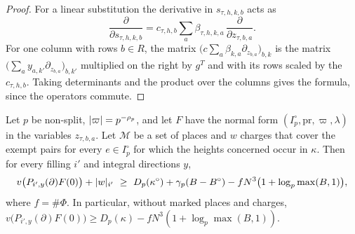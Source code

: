 \begin{proof}
For a linear substitution the derivative in $s_{\tau,h,k,b}$ acts as
\[
  \frac{\partial}{\partial s_{\tau,h,k,b}}=c_{\tau,h,b}\sum_a\beta_{\tau,h,k,a}\,
  \frac{\partial}{\partial z_{\tau,b,a}} .
\]
For one column with rows
$b\in R$, the matrix $\bigl(c\sum_a\beta_{k,a}\partial_{z_{b,a}}\bigr)_{b,k}$ is the matrix
$\bigl(\sum_ay_{a,k'}\partial_{z_{b,a}}\bigr)_{b,k'}$ multiplied on the right by $g^T$ and with its rows
scaled by the $c_{\tau,h,b}$. Taking determinants and the product over the columns gives the formula,
since the operators commute.
\end{proof}

\begin{theorem}\label{thm:count}
Let $p$ be non-split, $\lvert \varpi\rvert=p^{-\rho_p}$, and let $F$ have the normal form
$(I_p^\circ,\mathrm{pr},\varpi,\lambda)$ in the variables $z_{\tau,b,a}$. Let $\mathcal M$ be a set of
places and $w$ charges that cover the exempt pairs for every $e\in I_p^\circ$ for which the heights
concerned occur in $\kappa$. Then for every filling $i'$ and integral directions $y$,
\[
  v\bigl(P_{i',y}(\partial)F(0)\bigr)+\lvert w\rvert_{i'}\ \ge\ D_p(\kappa^\circ)+\gamma_p(B-B^\circ)
  -fN^3\bigl(1+\log_p\max(B,1)\bigr),
\]
where $f=\#\Phi$. In particular, without marked places and charges,
$v\bigl(P_{i',y}(\partial)F(0)\bigr)\ge D_p(\kappa)-fN^3(1+\log_p\max(B,1))$.
\end{theorem}

